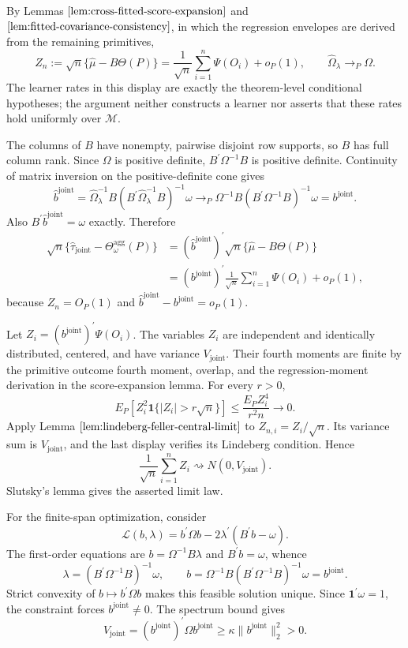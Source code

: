 By Lemmas \(\ref{lem:cross-fitted-score-expansion}\) and \(\ref{lem:fitted-covariance-consistency}\), in which the regression envelopes are derived from the remaining primitives,
\[
 Z_n:=\sqrt n\{\widehat\mu-B\Theta(P)\}
 =\frac1{\sqrt n}\sum_{i=1}^n\Psi(O_i)+o_P(1),
 \qquad
 \widehat\Omega_\lambda\to_P\Omega.
\]
The learner rates in this display are exactly the theorem-level conditional hypotheses; the argument neither constructs a learner nor asserts that these rates hold uniformly over \(\mathcal M\).

The columns of \(B\) have nonempty, pairwise disjoint row supports, so \(B\) has full column rank. Since \(\Omega\) is positive definite, \(B^{\prime}\Omega^{-1}B\) is positive definite. Continuity of matrix inversion on the positive-definite cone gives
\[
 \widehat b^{\mathrm{joint}}
 =\widehat\Omega_\lambda^{-1}B
 (B^{\prime}\widehat\Omega_\lambda^{-1}B)^{-1}\omega
 \to_P
 \Omega^{-1}B(B^{\prime}\Omega^{-1}B)^{-1}\omega
 =b^{\mathrm{joint}}.
\]
Also \(B^{\prime}\widehat b^{\mathrm{joint}}=\omega\) exactly. Therefore
\[
\begin{aligned}
 \sqrt n\{\widehat\tau_{\mathrm{joint}}-\Theta_\omega^{\mathrm{agg}}(P)\}
 &=(\widehat b^{\mathrm{joint}})^{\prime}
   \sqrt n\{\widehat\mu-B\Theta(P)\}\\
 &=(b^{\mathrm{joint}})^{\prime}\frac1{\sqrt n}
   \sum_{i=1}^n\Psi(O_i)+o_P(1),
\end{aligned}
\]
because \(Z_n=O_P(1)\) and \(\widehat b^{\mathrm{joint}}-b^{\mathrm{joint}}=o_P(1)\).

Let \(Z_i=(b^{\mathrm{joint}})^{\prime}\Psi(O_i)\). The variables \(Z_i\) are independent and identically distributed, centered, and have variance \(V_{\mathrm{joint}}\). Their fourth moments are finite by the primitive outcome fourth moment, overlap, and the regression-moment derivation in the score-expansion lemma. For every \(r>0\),
\[
 E_P\!\left[Z_i^2\mathbf 1\{|Z_i|>r\sqrt n\}\right]
 \le\frac{E_PZ_i^4}{r^2n}\longrightarrow0.
\]
Apply Lemma \(\ref{lem:lindeberg-feller-central-limit}\) to \(Z_{n,i}=Z_i/\sqrt n\). Its variance sum is \(V_{\mathrm{joint}}\), and the last display verifies its Lindeberg condition. Hence
\[
 \frac1{\sqrt n}\sum_{i=1}^nZ_i\rightsquigarrow N(0,V_{\mathrm{joint}}).
\]
Slutsky's lemma gives the asserted limit law.

For the finite-span optimization, consider
\[
 \mathcal L(b,\lambda)=b^{\prime}\Omega b
 -2\lambda^{\prime}(B^{\prime}b-\omega).
\]
The first-order equations are \(b=\Omega^{-1}B\lambda\) and \(B^{\prime}b=\omega\), whence
\[
 \lambda=(B^{\prime}\Omega^{-1}B)^{-1}\omega,
 \qquad
 b=\Omega^{-1}B(B^{\prime}\Omega^{-1}B)^{-1}\omega
 =b^{\mathrm{joint}}.
\]
Strict convexity of \(b\mapsto b^{\prime}\Omega b\) makes this feasible solution unique. Since \(\mathbf 1^{\prime}\omega=1\), the constraint forces \(b^{\mathrm{joint}}\ne0\). The spectrum bound gives
\[
 V_{\mathrm{joint}}
 =(b^{\mathrm{joint}})^{\prime}\Omega b^{\mathrm{joint}}
 \ge\kappa\|b^{\mathrm{joint}}\|_2^2>0.
\]

